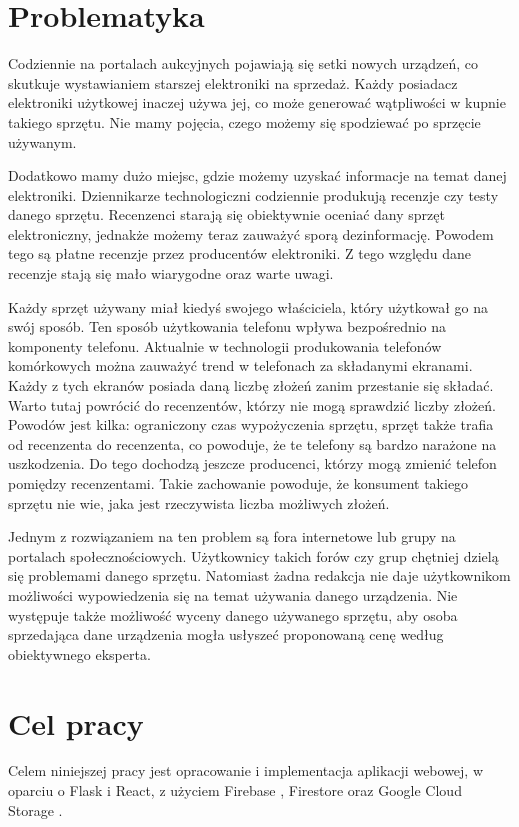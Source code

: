 \section{Problematyka}
Codziennie na portalach aukcyjnych pojawiają się setki nowych urządzeń, co skutkuje wystawianiem starszej elektroniki na sprzedaż. Każdy posiadacz elektroniki użytkowej inaczej używa jej, co może generować wątpliwości w kupnie takiego sprzętu. Nie mamy pojęcia, czego możemy się spodziewać po sprzęcie używanym.

Dodatkowo mamy dużo miejsc, gdzie możemy uzyskać informacje na temat danej elektroniki. Dziennikarze technologiczni codziennie produkują recenzje czy testy danego sprzętu. Recenzenci starają się obiektywnie oceniać dany sprzęt elektroniczny, jednakże możemy teraz zauważyć sporą dezinformację. Powodem tego są płatne recenzje przez producentów elektroniki. Z tego względu dane recenzje stają się mało wiarygodne oraz warte uwagi.

Każdy sprzęt używany miał kiedyś swojego właściciela, który użytkował go na swój sposób. Ten sposób użytkowania telefonu wpływa bezpośrednio na komponenty telefonu. Aktualnie w technologii produkowania telefonów komórkowych można zauważyć trend w telefonach za składanymi ekranami. Każdy z tych ekranów posiada daną liczbę złożeń zanim przestanie się składać. Warto tutaj powrócić do recenzentów, którzy nie mogą  sprawdzić liczby złożeń. Powodów jest kilka: ograniczony czas wypożyczenia sprzętu, sprzęt także trafia od recenzenta do recenzenta, co powoduje, że te telefony są bardzo narażone na uszkodzenia. Do tego dochodzą jeszcze producenci, którzy mogą zmienić telefon pomiędzy recenzentami. Takie zachowanie powoduje, że konsument takiego sprzętu nie wie, jaka jest rzeczywista liczba możliwych złożeń.

Jednym z rozwiązaniem na ten problem są fora internetowe lub grupy na portalach społecznościowych. Użytkownicy takich forów czy grup chętniej dzielą się problemami danego sprzętu. Natomiast żadna redakcja nie daje użytkownikom możliwości wypowiedzenia się na temat używania danego urządzenia. Nie występuje także możliwość wyceny danego używanego sprzętu, aby osoba sprzedająca dane urządzenia mogła usłyszeć proponowaną cenę według obiektywnego eksperta.

\section{Cel pracy}
Celem niniejszej pracy jest opracowanie i implementacja aplikacji webowej, w oparciu o Flask i React, z użyciem Firebase \cite*{firebase}, Firestore \cite*{firestore} oraz Google Cloud Storage \cite*{cloud_storage}.

